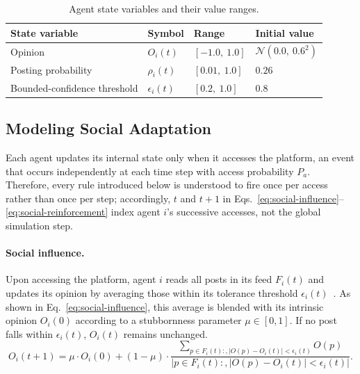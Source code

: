 \documentclass{svproc}
\def\Blue{\color[rgb]{0,0,1}}
\def\Black{\color[rgb]{0,0,0}}
\def\post{\rho}                 %
\def\BoundedConfidence{\epsilon} %
\def\feed{F}                    %
\def\Stubbornness{\mu}           %
\begin{document}
\begin{table}[t]\Blue
\centering
\caption{Agent state variables and their value
  ranges.}\label{tab:state}
\tabcolsep=5pt
\begin{tabular}{llll}
\toprule
State variable & Symbol & Range & Initial value \\
\midrule
Opinion & $O_i(t)$ & $[-1.0,\ 1.0]$ & $\mathcal{N}(0.0,\ 0.6^2)$ \\
Posting probability & $\post_i(t)$ & $[0.01,\ 1.0]$ & $0.26$ \\
Bounded-confidence threshold & $\BoundedConfidence_i(t)$ & $[0.2,\ 1.0]$ & $0.8$ \\
\bottomrule
\end{tabular}\Black
\end{table}



\subsection{Modeling Social Adaptation}\label{sec:model-adaptation}
Each agent updates its internal state only when it accesses the
platform, an event that occurs independently at each time step with
access probability $P_a$. Therefore, every rule introduced below is
understood to fire once per access rather than once per step;
accordingly, $t$ and $t{+}1$ in
Eqs.~\eqref{eq:social-influence}--\eqref{eq:social-reinforcement} index
agent $i$'s successive accesses, not the global simulation step.
\par


\paragraph{Social influence.}
Upon accessing the platform, agent $i$ reads all posts in its feed
$\feed_i(t)$ and updates its opinion by averaging those within its
tolerance threshold $\BoundedConfidence_i(t)$~\cite{friedkin1990}. As
shown in Eq.~\eqref{eq:social-influence}, this average is blended with
its intrinsic opinion $O_i(0)$ according to a stubbornness parameter
$\Stubbornness\in[0,1]$. If no post falls within
$\BoundedConfidence_i(t)$, $O_i(t)$ remains unchanged.
%
\begin{equation}
  O_i(t{+}1) = \Stubbornness\cdot O_i(0)
  + (1-\Stubbornness)\cdot
  \frac{\sum_{p\in \feed_i(t):,|O(p)-O_i(t)|<\BoundedConfidence_i(t)}
    O(p)}%
       {\big|{p\in \feed_i(t):,|O(p)-O_i(t)|<\BoundedConfidence_i(t)}\big|}.
  \label{eq:social-influence}
\end{equation}
%
\end{document}
